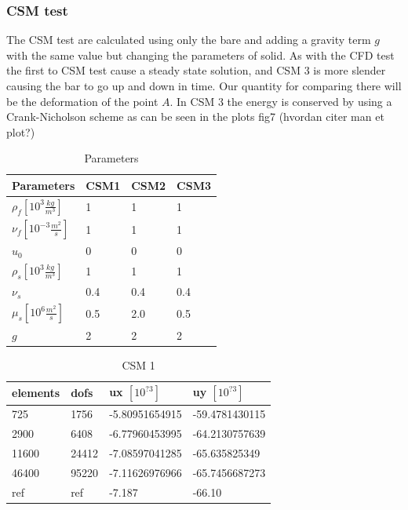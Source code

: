 \subsubsection*{CSM test}
The CSM test are calculated using only the bare and adding a gravity term $g$ with the same value but changing the parameters of solid.
As with the CFD test the first to CSM test cause a steady state solution, and CSM 3 is more slender causing the bar to go up and down in time. Our quantity for comparing there will be the deformation of the point $A$. In CSM 3 the energy is conserved by using a Crank-Nicholson scheme as can be seen in the plots fig7 (hvordan citer man et plot?)

\begin{table}[h!]
\centering
\caption{Parameters}
\label{my-label}
\begin{tabular}{|l|l|l|l|}
\hline
Parameters & CSM1 & CSM2 & CSM3 \\ \hline
$\rho_f[10^3 \frac{kg}{m^3}]$ & 1 & 1 & 1 \\ \hline
$\nu_f [10^{-3} \frac{m^2}{s}]$ & 1 & 1 & 1 \\ \hline
$u_0$ & 0 & 0 & 0 \\ \hline
$\rho_s[10^3 \frac{kg}{m^3}]$ & 1 & 1 & 1 \\ \hline
$\nu_s$ & 0.4 & 0.4 & 0.4 \\ \hline
$\mu_s[10^6 \frac{m^2}{s}]$ & 0.5 & 2.0 & 0.5 \\ \hline
$g $ & 2 & 2 & 2 \\ \hline
\end{tabular}
\end{table}

\begin{table}[h!]
\centering
\caption{CSM 1}
\label{my-label}
\begin{tabular}{|l|l|l|l|}
\hline
elements & dofs & ux $[10^{?3}]$ & uy $[10^{?3}]$ \\ \hline
725 & 1756 & -5.80951654915 & -59.4781430115 \\ \hline
2900 & 6408 & -6.77960453995 & -64.2130757639 \\ \hline
11600 & 24412 & -7.08597041285 & -65.635825349 \\ \hline
46400 & 95220 & -7.11626976966 & -65.7456687273 \\ \hline
ref & ref & -7.187 & -66.10 \\ \hline
\end{tabular}
\end{table}

